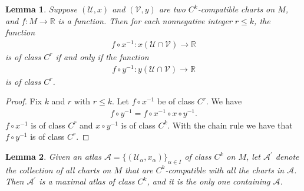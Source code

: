 \documentclass{book}
\theoremstyle{custom_definition}
\theoremstyle{custom_theorem}
\newtheorem{lemma}{Lemma}
\begin{document}
    \begin{lemma}
        Suppose \((\mathcal{U}, x)\) and \((\mathcal{V}, y)\) are two \(C^k\)-compatible charts on \(M\), and \(f: M \longrightarrow \mathbb{R}\) is a function. Then for each nonnegative integer \(r \leq k\), the function
        \begin{align}
            f \circ x^{-1}: x(\mathcal{U} \cap \mathcal{V}) \longrightarrow \mathbb{R}
        \end{align}
        is of class \(C^r\) if and only if the function
        \begin{align}
            f \circ y^{-1}: y(\mathcal{U} \cap \mathcal{V}) \longrightarrow \mathbb{R}
        \end{align}
        is of class \(C^r\).
    \end{lemma}
    \begin{proof}
        Fix \(k\) and \(r\) with \(r \leq k\). Let \(f \circ x^{-1}\) be of class \(C^r\). We have
        \begin{align}
            f \circ y^{-1} = f \circ x^{-1} \circ x \circ y^{-1} \text{.}
        \end{align}
    \(f \circ x^{-1}\) is of class \(C^r\) and \(x \circ y^{-1}\) is of class \(C^k\). With the chain rule we have that \(f \circ y^{-1}\) is of class \(C^r\).
    \end{proof}
    \begin{lemma}
        Given an atlas \(\mathcal{A} = \{(\mathcal{U}_\alpha, x_\alpha)\}_{\alpha \in I}\) of class \(C^k\) on \(M\), let \(\mathcal{A}^\prime\) denote the collection of all charts on \(M\) that are \(C^k\)-compatible with all the charts in \(\mathcal{A}\). Then \(\mathcal{A}^\prime\) is a maximal atlas of class \(C^k\), and it is the only one containing \(\mathcal{A}\).
    \end{lemma}
\end{document}
